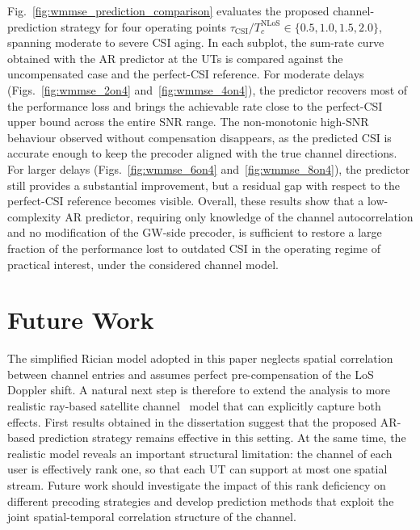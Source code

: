 \documentclass[conference]{IEEEtran}
\begin{document}
Fig.~\ref{fig:wmmse_prediction_comparison} evaluates the proposed channel-prediction strategy for four operating points $\tau_{\mathrm{CSI}}/T_c^{\mathrm{NLoS}} \in \{0.5, 1.0, 1.5, 2.0\}$, spanning moderate to severe \ac{CSI} aging.
In each subplot, the sum-rate curve obtained with the \ac{AR} predictor at the \acp{UT} is compared against the uncompensated case and the perfect-\ac{CSI} reference.
For moderate delays (Figs.~\ref{fig:wmmse_2on4} and~\ref{fig:wmmse_4on4}), the predictor recovers most of the performance loss and brings the achievable rate close to the perfect-\ac{CSI} upper bound across the entire \ac{SNR} range.
The non-monotonic high-\ac{SNR} behaviour observed without compensation disappears, as the predicted \ac{CSI} is accurate enough to keep the precoder aligned with the true channel directions.
For larger delays (Figs.~\ref{fig:wmmse_6on4} and~\ref{fig:wmmse_8on4}), the predictor still provides a substantial improvement, but a residual gap with respect to the perfect-\ac{CSI} reference becomes visible.
Overall, these results show that a low-complexity \ac{AR} predictor, requiring only knowledge of the channel autocorrelation and no modification of the \ac{GW}-side precoder, is sufficient to restore a large fraction of the performance lost to outdated \ac{CSI} in the operating regime of practical interest, under the considered channel model.

\section{Future Work}
\label{section:future_work}

The simplified Rician model adopted in this paper neglects spatial correlation between channel entries and assumes perfect pre-compensation of the \ac{LoS} Doppler shift. 
A natural next step is therefore to extend the analysis to more realistic ray-based satellite channel~\cite{massive_mimo_leo_chinese} model that can explicitly capture both effects.
First results obtained in the dissertation suggest that the proposed \ac{AR}-based prediction strategy remains effective in this setting.
At the same time, the realistic model reveals an important structural limitation: the channel of each user is effectively rank one, so that each \ac{UT} can support at most one spatial stream.
Future work should investigate the impact of this rank deficiency on different precoding strategies and develop prediction methods that exploit the joint spatial-temporal correlation structure of the channel.
\end{document}
